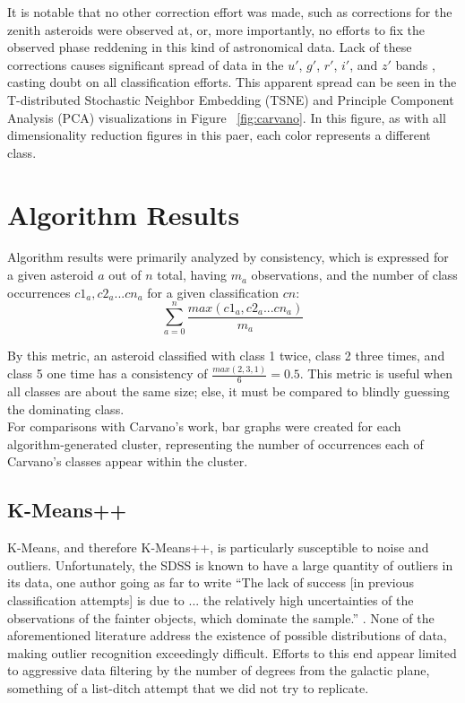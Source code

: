 \documentclass[conference]{IEEEtran}
\begin{document}
It is notable that no other correction effort was made, such as corrections for the zenith asteroids were observed at, or, more importantly, no efforts to fix the observed phase reddening \cite{sanchez} in this kind of astronomical data.
Lack of these corrections causes significant spread of data in the $u'$, $g'$, $r'$, $i'$, and $z'$ bands \cite{sanchez}, casting doubt on all classification efforts.
This apparent spread can be seen in the T-distributed Stochastic Neighbor Embedding (TSNE) and Principle Component Analysis (PCA) visualizations in Figure ~\ref{fig:carvano}. In this figure, as with all dimensionality reduction figures in this paer, each color represents a different class.
\\

\section{Algorithm Results}
Algorithm results were primarily analyzed by consistency, which is expressed for a given asteroid $a$ out of $n$ total, having $m_a$ observations, and the number of class occurrences $c1_a, c2_a ... cn_a$ for a given classification $cn$:
$$
\sum_{a=0}^n \dfrac{max(c1_a, c2_a ... cn_a)}{m_a}
$$

By this metric, an asteroid classified with class 1 twice, class 2 three times, and class 5 one time has a consistency of $\frac{max(2, 3, 1)}{6} = 0.5$.
This metric is useful when all classes are about the same size; else, it must be compared to blindly guessing the dominating class.
\\

For comparisons with Carvano's work, bar graphs were created for each algorithm-generated cluster, representing the number of occurrences each of Carvano's classes appear within the cluster.

\subsection{K-Means++}
K-Means, and therefore K-Means++, is particularly susceptible to noise and outliers.
Unfortunately, the SDSS is known to have a large quantity of outliers in its data, one author going as far to write ``The lack of success [in previous classification attempts] is due to ... the relatively high uncertainties of the observations of the fainter objects, which dominate the sample.'' \cite{hm}.
None of the aforementioned literature address the existence of possible distributions of data, making outlier recognition exceedingly difficult.
Efforts to this end appear limited to aggressive data filtering \cite{hm_gmode} by the number of degrees from the galactic plane, something of a list-ditch attempt that we did not try to replicate.
\\
\end{document}
